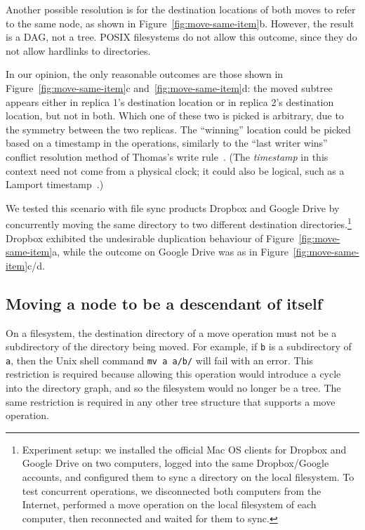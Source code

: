 \documentclass[sigplan,anonymous]{acmart}
\begin{document}
Another possible resolution is for the destination locations of both moves to refer to the same node, as shown in Figure~\ref{fig:move-same-item}b.
However, the result is a DAG, not a tree.
POSIX filesystems do not allow this outcome, since they do not allow hardlinks to directories.

In our opinion, the only reasonable outcomes are those shown in Figure~\ref{fig:move-same-item}c and~\ref{fig:move-same-item}d: the moved subtree appears either in replica 1's destination location or in replica 2's destination location, but not in both.
Which one of these two is picked is arbitrary, due to the symmetry between the two replicas.
The ``winning'' location could be picked based on a timestamp in the operations, similarly to the ``last writer wins'' conflict resolution method of Thomas's write rule~\cite{Johnson:1975we}.
(The \emph{timestamp} in this context need not come from a physical clock; it could also be logical, such as a Lamport timestamp~\cite{Lamport:1978jq}.)

We tested this scenario with file sync products Dropbox and Google Drive by concurrently moving the same directory to two different destination directories.\footnote{Experiment setup: we installed the official Mac OS clients for Dropbox and Google Drive on two computers, logged into the same Dropbox/Google accounts, and configured them to sync a directory on the local filesystem.
To test concurrent operations, we disconnected both computers from the Internet, performed a move operation on the local filesystem of each computer, then reconnected and waited for them to sync.}
Dropbox exhibited the undesirable duplication behaviour of Figure~\ref{fig:move-same-item}a, while the outcome on Google Drive was as in Figure~\ref{fig:move-same-item}c/d.

\subsection{Moving a node to be a descendant of itself}\label{sec:move-cycle}

On a filesystem, the destination directory of a move operation must not be a subdirectory of the directory being moved.
For example, if \texttt{b} is a subdirectory of \texttt{a}, then the Unix shell command \texttt{mv a a/b/} will fail with an error.
This restriction is required because allowing this operation would introduce a cycle into the directory graph, and so the filesystem would no longer be a tree.
The same restriction is required in any other tree structure that supports a move operation.
\end{document}
